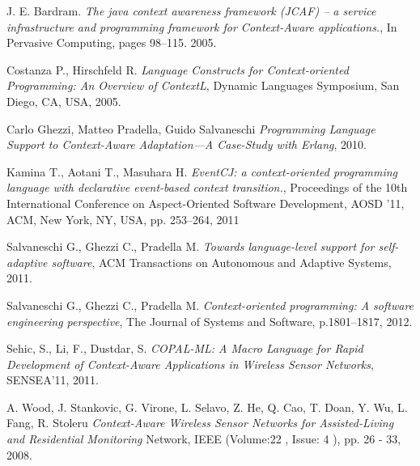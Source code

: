 \begin{thebibliography}{1}

J. E. Bardram. \emph{The java context awareness framework (JCAF) – a service infrastructure and programming framework for Context-Aware applications.}, 
In Pervasive Computing, pages 98–115. 2005.

Costanza P., Hirschfeld R. \emph{Language Constructs for Context-oriented Programming: An Overview of ContextL},
Dynamic Languages Symposium, San Diego, CA, USA, 2005.

Carlo Ghezzi, Matteo Pradella, Guido Salvaneschi \emph{Programming Language Support to Context-Aware Adaptation—A Case-Study with Erlang}, 2010.

Kamina T., Aotani T., Masuhara H. \emph{EventCJ: a context-oriented programming language with declarative event-based context transition.},
Proceedings of the 10th International Conference on Aspect-Oriented Software Development, AOSD ’11, ACM, New York, NY, USA, pp. 253–264, 2011

Salvaneschi G., Ghezzi C., Pradella M.
\emph{Towards language-level support for self-adaptive software},
ACM Transactions on Autonomous and Adaptive Systems, 2011.

Salvaneschi G., Ghezzi C., Pradella M. 
\emph{Context-oriented  programming:  A  software  engineering  perspective},
The  Journal  of  Systems  and  Software, p.1801–1817, 2012.

Sehic, S., Li, F., Dustdar, S. \emph{COPAL-ML: A Macro Language for Rapid Development of Context-Aware Applications in Wireless Sensor Networks}, 
SENSEA'11, 2011.

A. Wood, J. Stankovic, G. Virone, L. Selavo, Z. He, Q. Cao, T. Doan, Y. Wu, L. Fang, R. Stoleru 
\emph{Context-Aware Wireless Sensor Networks for Assisted-Living and Residential Monitoring}
Network, IEEE  (Volume:22 ,  Issue: 4 ), pp. 26 - 33, 2008.

\end{thebibliography}